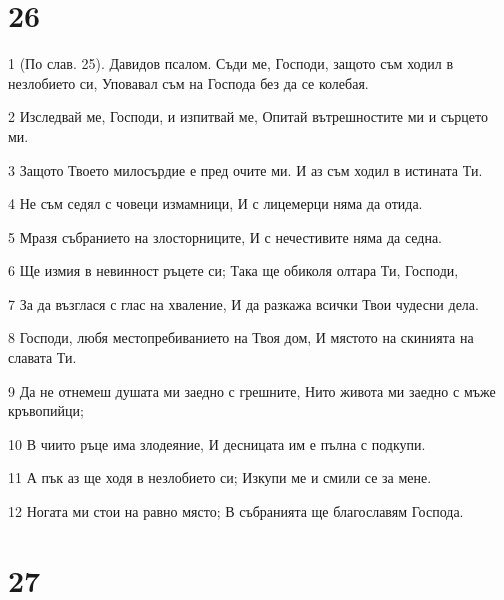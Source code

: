 \chapter{26}

\par 1 (По слав. 25). Давидов псалом. Съди ме, Господи, защото съм ходил в незлобието си, Уповавал съм на Господа без да се колебая.
\par 2 Изследвай ме, Господи, и изпитвай ме, Опитай вътрешностите ми и сърцето ми.
\par 3 Защото Твоето милосърдие е пред очите ми. И аз съм ходил в истината Ти.
\par 4 Не съм седял с човеци измамници, И с лицемерци няма да отида.
\par 5 Мразя събранието на злосторниците, И с нечестивите няма да седна.
\par 6 Ще измия в невинност ръцете си; Така ще обиколя олтара Ти, Господи,
\par 7 За да възглася с глас на хваление, И да разкажа всички Твои чудесни дела.
\par 8 Господи, любя местопребиванието на Твоя дом, И мястото на скинията на славата Ти.
\par 9 Да не отнемеш душата ми заедно с грешните, Нито живота ми заедно с мъже кръвопийци;
\par 10 В чиито ръце има злодеяние, И десницата им е пълна с подкупи.
\par 11 А пък аз ще ходя в незлобието си; Изкупи ме и смили се за мене.
\par 12 Ногата ми стои на равно място; В събранията ще благославям Господа.

\chapter{27}

